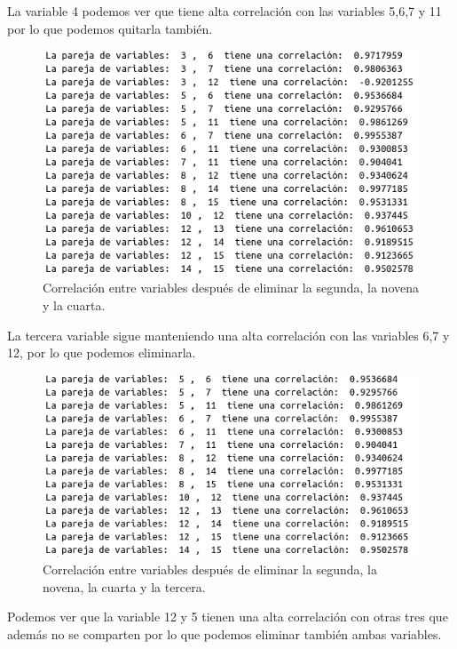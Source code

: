 \documentclass[12pt,a4paper]{article}
\begin{document}
La variable 4 podemos ver que tiene alta correlación con las variables 5,6,7 y 11 por lo que podemos quitarla también.

\begin{figure}[H]
	\centering
	\includegraphics[scale=0.6]{./Imagenes/EDA/Regresion/correlacion_entre_variables4.png}
	\caption{Correlación entre variables después de eliminar la segunda, la novena y la cuarta.}
\end{figure}

La tercera variable sigue manteniendo una alta correlación con las variables 6,7 y 12, por lo que podemos eliminarla.

\begin{figure}[H]
	\centering
	\includegraphics[scale=0.6]{./Imagenes/EDA/Regresion/correlacion_entre_variables5.png}
	\caption{Correlación entre variables después de eliminar la segunda, la novena, la cuarta y la tercera.}
\end{figure}

Podemos ver que la variable 12 y 5 tienen una alta correlación con otras tres que además  no se comparten por lo que podemos eliminar también ambas variables.
\end{document}
